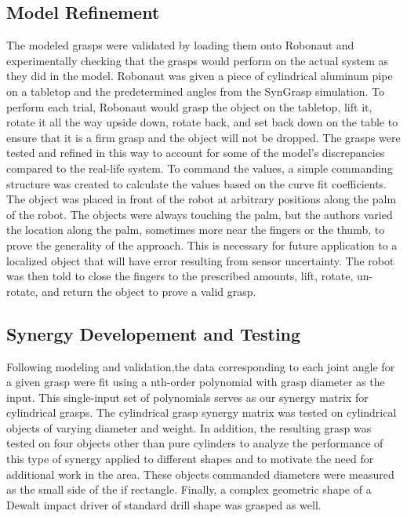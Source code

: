 \documentclass[letterpaper, 10 pt, conference]{ieeeconf}  %
\begin{document}
\subsection{Model Refinement}
 The modeled grasps were validated by loading them onto Robonaut and experimentally checking that the grasps would perform on the actual system as they did in the model.  Robonaut was given a piece of cylindrical aluminum pipe on a tabletop and the predetermined angles from the SynGrasp simulation.  To perform each trial, Robonaut would grasp the object on the tabletop, lift it, rotate it all the way upside down, rotate back, and set back down on the table to ensure that it is a firm grasp and the object will not be dropped.  The grasps were tested and refined in this way to account for some of the model's discrepancies compared to the real-life system.  To command the values, a simple commanding structure was created to calculate the values based on the curve fit coefficients. The object was placed in front of the robot at arbitrary positions along the palm of the robot. The objects were always touching the palm, but the authors varied the location along the palm, sometimes more near the fingers or the thumb, to prove the generality of the approach. This is necessary for future application to a localized object that will have error resulting from sensor uncertainty. The robot was then told to close the fingers to the prescribed amounts, lift, rotate, un-rotate, and return the object to prove a valid grasp.

\subsection{Synergy Developement and Testing}	
Following modeling and validation,the data corresponding to each joint angle for a given grasp were fit using a nth-order polynomial with grasp diameter as the input.  This single-input set of polynomials serves as our synergy matrix for cylindrical grasps.  The cylindrical grasp synergy matrix was tested on cylindrical  objects of varying diameter and weight.   In addition, the resulting grasp was tested on four objects other than pure cylinders to analyze the performance of this type of synergy applied to different shapes and to motivate the need for additional work in the area.  These objects commanded diameters were measured as the small side of the if rectangle.  Finally, a complex geometric shape of a Dewalt impact driver of standard drill shape was grasped as well.
 
\end{document}
